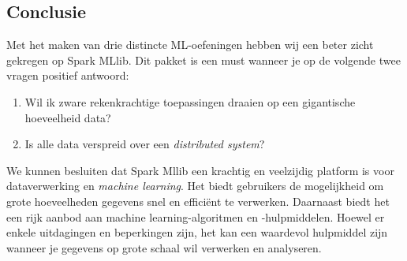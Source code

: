 \documentclass[a4paper,10pt,twoside]{report}
\begin{document}
\subsection*{Conclusie}

Met het maken van drie distincte ML-oefeningen hebben wij een beter zicht gekregen op Spark MLlib. Dit pakket is een must wanneer je op de volgende twee vragen positief antwoord: 
\begin{enumerate}
	\item Wil ik zware rekenkrachtige toepassingen draaien op een gigantische hoeveelheid data?
	\item Is alle data verspreid over een \textit{distributed system}?
\end{enumerate}

We kunnen besluiten dat Spark Mllib een krachtig en veelzijdig platform is voor dataverwerking en \textit{machine learning}. Het biedt gebruikers de mogelijkheid om grote hoeveelheden gegevens snel en efficiënt te verwerken. Daarnaast biedt het een rijk aanbod aan machine learning-algoritmen en -hulpmiddelen. Hoewel er enkele uitdagingen en beperkingen zijn, het kan een waardevol hulpmiddel zijn wanneer je gegevens op grote schaal wil verwerken en analyseren.

\appendix
\end{document}
